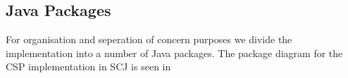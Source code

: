 \subsection{Java Packages}
For organisation and seperation of concern purposes we divide the implementation into a number of Java packages. The package diagram for the CSP implementation in SCJ is seen in  